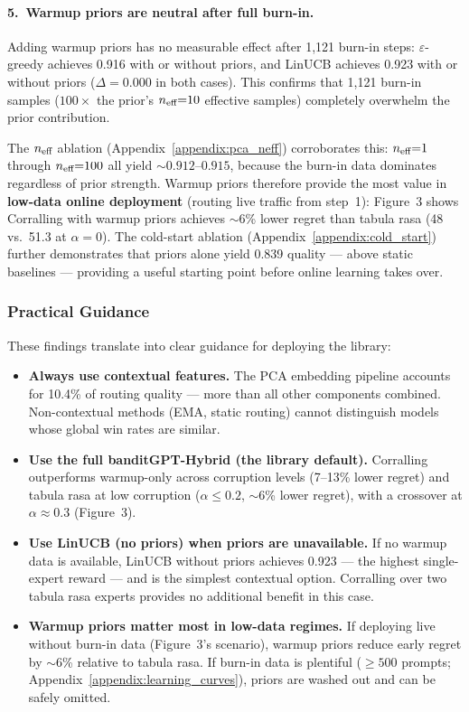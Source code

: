 \paragraph{5.\ Warmup priors are neutral after full burn-in.}
Adding warmup priors has no measurable effect after 1,121 burn-in steps:
$\varepsilon$-greedy achieves 0.916 with or without priors, and LinUCB
achieves 0.923 with or without priors ($\Delta{=}0.000$ in both cases).
This confirms that 1,121 burn-in samples ($100\times$ the prior's
$n_{\text{eff}}{=}10$ effective samples) completely overwhelm the prior
contribution.

The $n_{\text{eff}}$ ablation (Appendix~\ref{appendix:pca_neff}) corroborates this:
$n_{\text{eff}}{=}1$ through $n_{\text{eff}}{=}100$ all yield ${\sim}0.912$--$0.915$,
because the burn-in data dominates regardless of prior strength.  Warmup
priors therefore provide the most value in \textbf{low-data online
deployment} (routing live traffic from step~1): Figure~3 shows Corralling
with warmup priors achieves ${\sim}$6\% lower regret than tabula rasa
(48 vs.\ 51.3 at $\alpha{=}0$).  The cold-start ablation
(Appendix~\ref{appendix:cold_start}) further demonstrates that priors
alone yield 0.839 quality --- above static baselines --- providing a
useful starting point before online learning takes over.

\subsubsection{Practical Guidance}

These findings translate into clear guidance for deploying the library:

\begin{itemize}[leftmargin=*,noitemsep]
    \item \textbf{Always use contextual features.}  The PCA embedding pipeline
          accounts for 10.4\% of routing quality --- more than all other
          components combined.  Non-contextual methods (EMA, static routing)
          cannot distinguish models whose global win rates are similar.
    \item \textbf{Use the full banditGPT-Hybrid (the library default).}
          Corralling outperforms warmup-only across corruption levels
          (7--13\% lower regret) and tabula rasa at low corruption
          ($\alpha \leq 0.2$, ${\sim}$6\% lower regret), with a
          crossover at $\alpha \approx 0.3$ (Figure~3).
    \item \textbf{Use LinUCB (no priors) when priors are unavailable.}
          If no warmup data is available, LinUCB without priors achieves
          0.923 --- the highest single-expert reward --- and is the simplest
          contextual option.  Corralling over two tabula rasa experts
          provides no additional benefit in this case.
    \item \textbf{Warmup priors matter most in low-data regimes.}
          If deploying live without burn-in data (Figure~3's scenario),
          warmup priors reduce early regret by ${\sim}$6\% relative to tabula rasa.  If burn-in data is
          plentiful ($\geq 500$ prompts; Appendix~\ref{appendix:learning_curves}),
          priors are washed out and can be safely omitted.
\end{itemize}

